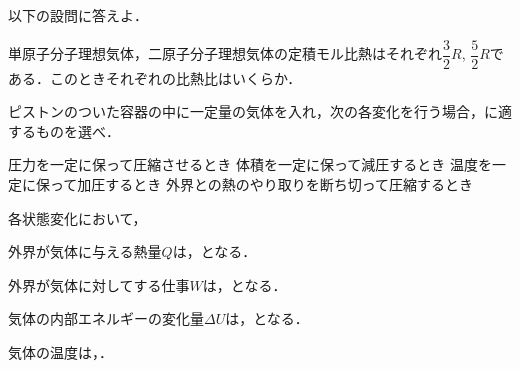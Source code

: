 
\setcounter{qno}{23}

\filbreak
{}


\hspace{1zw}以下の設問に答えよ．

\hspace{1zw}単原子分子理想気体，二原子分子理想気体の定積モル比熱はそれぞれ$\dfrac{3}{2}R$, $\dfrac{5}{2}R$である．このときそれぞれの比熱比はいくらか．

\filbreak
{}


\hspace{1zw}ピストンのついた容器の中に一定量の気体を入れ，次の各変化を行う場合，に適するものを選べ．
\begin{komon}
 圧力を一定に保って圧縮させるとき
 体積を一定に保って減圧するとき
 温度を一定に保って加圧するとき
 外界との熱のやり取りを断ち切って圧縮するとき
\end{komon}
\hspace{1zw}各状態変化において，
\begin{list}{}{\setlength{\leftmargin}{2zw}\setlength{\itemsep}{0.4mm}\setlength{\topsep}{0.6mm}\setlength{\parsep}{0pt}}
\item[・] 外界が気体に与える熱量$Q$は，となる．
\item[・] 外界が気体に対してする仕事$W$は，となる．
\item[・] 気体の内部エネルギーの変化量$\Delta U$は，となる．
\item[・] 気体の温度は，．
\end{list}


